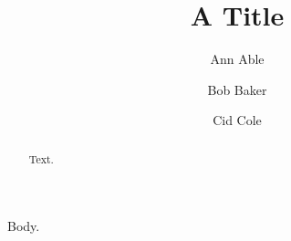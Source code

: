 \documentclass{llncs}
\begin{document}
\title{A Title}
\author{Ann Able \and Bob Baker \and Cid Cole}
\maketitle
\begin{abstract}Text.\end{abstract}
Body.
\end{document}
